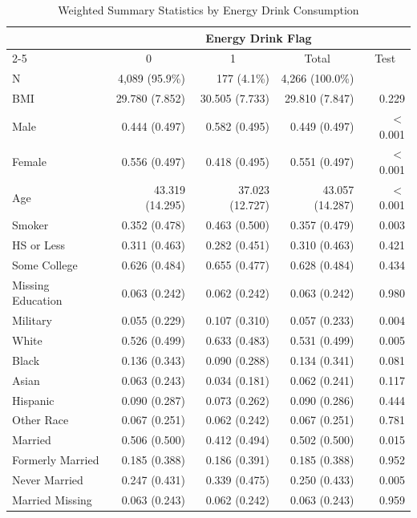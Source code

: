 \begin{table}[htbp]
\centering
\caption{Weighted Summary Statistics by Energy Drink Consumption}
\label{tab:weighted_summary}
\begin{tabular}{lrrrr}
\toprule
 & \multicolumn{4}{c}{Energy Drink Flag} \\
\cmidrule{2-5}
 & \multicolumn{1}{c}{0} & \multicolumn{1}{c}{1} & \multicolumn{1}{c}{Total} & \multicolumn{1}{c}{Test} \\
\midrule
N & 4,089 (95.9\%) & 177 (4.1\%) & 4,266 (100.0\%) & \\
BMI & 29.780 (7.852) & 30.505 (7.733) & 29.810 (7.847) & 0.229 \\
Male & 0.444 (0.497) & 0.582 (0.495) & 0.449 (0.497) & $<$0.001 \\
Female & 0.556 (0.497) & 0.418 (0.495) & 0.551 (0.497) & $<$0.001 \\
Age & 43.319 (14.295) & 37.023 (12.727) & 43.057 (14.287) & $<$0.001 \\
Smoker & 0.352 (0.478) & 0.463 (0.500) & 0.357 (0.479) & 0.003 \\
HS or Less & 0.311 (0.463) & 0.282 (0.451) & 0.310 (0.463) & 0.421 \\
Some College & 0.626 (0.484) & 0.655 (0.477) & 0.628 (0.484) & 0.434 \\
Missing Education & 0.063 (0.242) & 0.062 (0.242) & 0.063 (0.242) & 0.980 \\
Military & 0.055 (0.229) & 0.107 (0.310) & 0.057 (0.233) & 0.004 \\
White & 0.526 (0.499) & 0.633 (0.483) & 0.531 (0.499) & 0.005 \\
Black & 0.136 (0.343) & 0.090 (0.288) & 0.134 (0.341) & 0.081 \\
Asian & 0.063 (0.243) & 0.034 (0.181) & 0.062 (0.241) & 0.117 \\
Hispanic & 0.090 (0.287) & 0.073 (0.262) & 0.090 (0.286) & 0.444 \\
Other Race & 0.067 (0.251) & 0.062 (0.242) & 0.067 (0.251) & 0.781 \\
Married & 0.506 (0.500) & 0.412 (0.494) & 0.502 (0.500) & 0.015 \\
Formerly Married & 0.185 (0.388) & 0.186 (0.391) & 0.185 (0.388) & 0.952 \\
Never Married & 0.247 (0.431) & 0.339 (0.475) & 0.250 (0.433) & 0.005 \\
Married Missing & 0.063 (0.243) & 0.062 (0.242) & 0.063 (0.243) & 0.959 \\
\bottomrule
\end{tabular}
\end{table}
